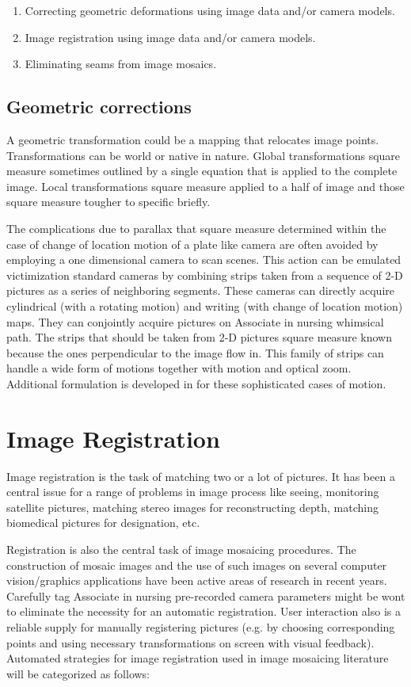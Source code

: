 \begin{enumerate}
	\item Correcting geometric deformations using image data and/or camera models.
	\item Image registration using image data and/or camera models.
	\item Eliminating seams from image mosaics.
\end{enumerate}

\subsection{Geometric corrections}
A geometric transformation could be a mapping that relocates image points. Transformations can be world or native in nature. Global transformations square measure sometimes outlined by a single equation that is applied to the complete image. Local transformations square measure applied to a half of image and those square measure tougher to specific briefly. 

The complications due to parallax that square measure determined within the case of change of location motion of a plate like camera are often avoided by employing a one dimensional camera to scan scenes. This action can be emulated victimization standard cameras by combining strips taken from a sequence of 2-D pictures as a series of neighboring segments. These cameras can directly acquire cylindrical (with a rotating motion) and writing (with change of location motion) maps. They can conjointly acquire pictures on Associate in nursing whimsical path. The strips that should be taken from 2-D pictures square measure known because the ones perpendicular to the image flow in. This family of strips can handle a wide form of motions together with motion and optical zoom. Additional formulation is developed in for these sophisticated cases of motion.

\section{Image Registration}
Image registration is the task of matching two or a lot of pictures. It has been a central issue for a range of problems in image process like seeing, monitoring satellite pictures, matching stereo images for reconstructing depth, matching biomedical pictures for designation, etc.

Registration is also the central task of image mosaicing procedures. The construction of mosaic images and the use of such images on several computer vision/graphics applications have been active areas of research in recent years. Carefully tag Associate in nursing pre-recorded camera parameters might be wont to eliminate the necessity for an automatic registration. User interaction also is a reliable supply for manually registering pictures (e.g. by choosing corresponding points and using necessary transformations on screen with visual feedback). Automated strategies for image registration used in image mosaicing literature will be categorized as follows:                                                                                                                                   

